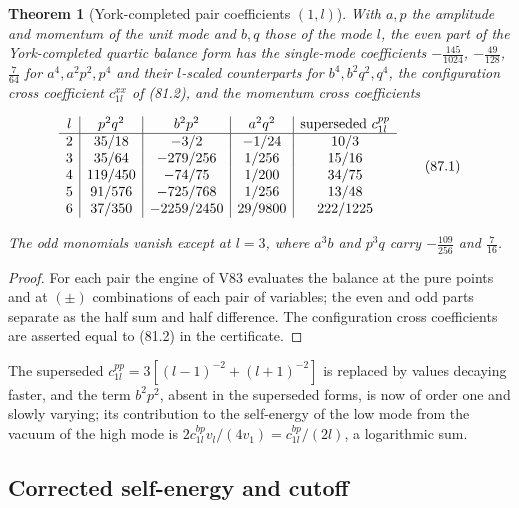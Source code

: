 \documentclass[11pt]{article}
\newtheorem{theorem}{Theorem}[section]
\theoremstyle{remark}
\begin{document}
\begin{theorem}[York-completed pair coefficients \((1,l)\)]
\label{thm:v19v84-pairs}
With \(a,p\) the amplitude and momentum of the unit mode and \(b,q\)
those of the mode \(l\), the even part of the York-completed quartic
balance form has the single-mode coefficients
\(-\tfrac{145}{1024}\), \(-\tfrac{49}{128}\), \(\tfrac7{64}\) for
\(a^4,a^2p^2,p^4\) and their \(l\)-scaled counterparts for
\(b^4,b^2q^2,q^4\), the configuration cross coefficient
\(c^{xx}_{1l}\) of (81.2), and the momentum cross coefficients

\[
\begin{array}{c|c|c|c|c}
l&p^2q^2&b^2p^2&a^2q^2&\hbox{superseded }c^{pp}_{1l}\\ \hline
2&35/18&-3/2&-1/24&10/3\\
3&35/64&-279/256&1/256&15/16\\
4&119/450&-74/75&1/200&34/75\\
5&91/576&-725/768&1/256&13/48\\
6&37/350&-2259/2450&29/9800&222/1225
\end{array}                                                            \tag{87.1}
\]

The odd monomials vanish except at \(l=3\), where \(a^3b\) and
\(p^3q\) carry \(-\tfrac{109}{256}\) and \(\tfrac7{16}\).
\end{theorem}

\begin{proof}
For each pair the engine of V83 evaluates the balance at the pure
points and at \((\pm)\) combinations of each pair of variables; the
even and odd parts separate as the half sum and half difference.  The
configuration cross coefficients are asserted equal to (81.2) in the
certificate.
\end{proof}

The superseded \(c^{pp}_{1l}=3[(l-1)^{-2}+(l+1)^{-2}]\) is replaced by
values decaying faster, and the term \(b^2p^2\), absent in the
superseded forms, is now of order one and slowly varying; its
contribution to the self-energy of the low mode from the vacuum of the
high mode is \(2c^{bp}_{1l}v_l/(4v_1)=c^{bp}_{1l}/(2l)\), a logarithmic
sum.

\subsection{Corrected self-energy and cutoff}
\end{document}
